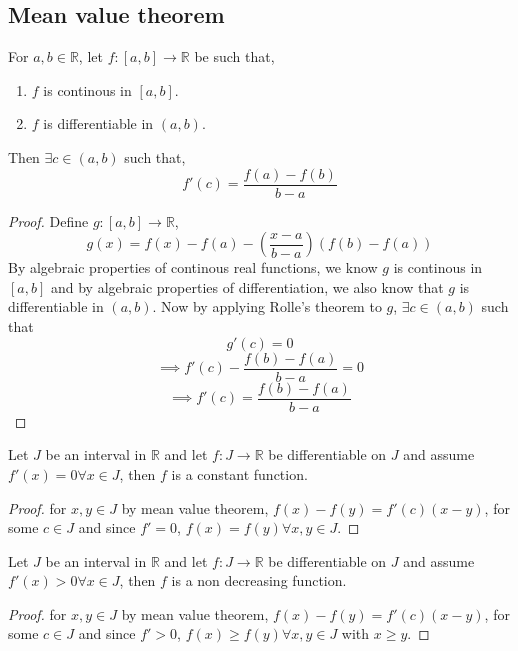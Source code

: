 \documentclass[11pt,a4paper]{colorart}
\def\l{\left}
\def\r{\right}
\def\R{\mathbb{R}}
\def\ra{\rightarrow}
\begin{document}
\subsection{Mean value theorem}

\begin{theorem}
	For $a,b \in \R$, let $f:[a,b] \ra \R$ be such that,
	\begin{enumerate}
		\item $f$ is continous in $[a,b]$.
		\item $f$ is differentiable in $(a,b)$.
	\end{enumerate}
	Then $\exists c \in (a,b)$ such that,
	\[ f'(c) = \frac{ f(a) - f(b) }{ b-a } \]
\end{theorem}

\begin{proof}
	Define $g:[a,b]\ra\R$,
	\[ g(x) = f(x) - f(a) - \l( \frac{ x-a }{ b-a } \r) ( f(b) - f(a) ) \]
	By algebraic properties of continous real functions, we know $g$ is continous in $[a,b]$ and by algebraic properties of differentiation, we also know that $g$ is differentiable in $(a,b)$. Now by applying Rolle's theorem to $g$, $\exists c \in (a,b)$ such that
	\[ g'(c) = 0 \]
	\[ \implies  f'(c) - \frac{ f(b)-f(a) }{ b-a } = 0 \]
	\[ \implies f'(c) = \frac{ f(b)-f(a) }{ b-a } \]
\end{proof}

\begin{example}
	Let $J$ be an interval in $\R$ and let $f:J\ra\R$ be differentiable on $J$ and assume $f'(x)=0 \forall x \in J$, then $f$ is a constant function.
\end{example}

\begin{proof}
	for $x,y\in J$ by mean value theorem, $f(x)-f(y)=f'(c)(x-y)$, for some $c\in J$ and since $f'=0$, $f(x) = f(y) \forall x,y \in J$.
\end{proof}

\begin{example}
	Let $J$ be an interval in $\R$ and let $f:J\ra\R$ be differentiable on $J$ and assume $f'(x)>0 \forall x \in J$, then $f$ is a non decreasing function.
\end{example}

\begin{proof}
	for $x,y\in J$ by mean value theorem, $f(x)-f(y)=f'(c)(x-y)$, for some $c\in J$ and since $f'>0$, $f(x) \geq f(y) \forall x,y \in J$ with $x\geq y$.
\end{proof}
\end{document}
